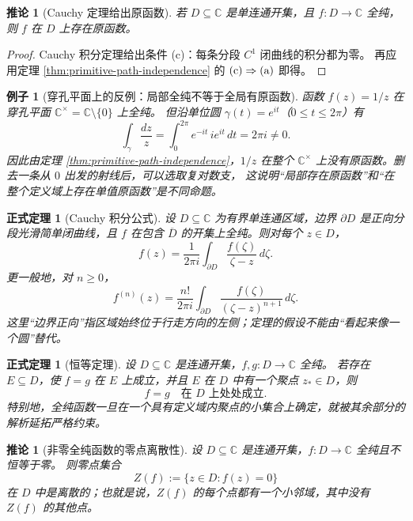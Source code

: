 \documentclass[UTF8,fontset=none,a4paper,11pt]{ctexart}
\theoremstyle{foundation-definition}
\theoremstyle{foundation-theorem}
\newtheorem{theorem}[definition]{正式定理}
\theoremstyle{foundation-proposition}
\theoremstyle{foundation-example}
\newtheorem{example}[definition]{例子}
\theoremstyle{foundation-remark}
\theoremstyle{foundation-theorem}
\newtheorem{corollary}[definition]{推论}
\newcommand{\C}{\mathbb C}
\begin{document}
\begin{corollary}[Cauchy 定理给出原函数]\label{cor:cauchy-primitive}
若 \(D\subseteq\mathbb C\) 是单连通开集，且 \(f:D\to\mathbb C\) 全纯，
则 \(f\) 在 \(D\) 上存在原函数。
\end{corollary}

\begin{proof}
Cauchy 积分定理给出条件 \textup{(c)}：每条分段 \(C^1\) 闭曲线的积分都为零。
再应用定理 \ref{thm:primitive-path-independence} 的
\(\textup{(c)}\Rightarrow\textup{(a)}\) 即得。
\end{proof}

\begin{example}[穿孔平面上的反例：局部全纯不等于全局有原函数]
函数 \(f(z)=1/z\) 在穿孔平面 \(\mathbb C^\times=\mathbb C\setminus\{0\}\) 上全纯。
但沿单位圆 \(\gamma(t)=e^{it}\)（\(0\leq t\leq2\pi\)）有
\[
\int_\gamma\frac{dz}{z}
=\int_0^{2\pi}e^{-it}\,i e^{it}\,dt
=2\pi i\neq0.
\]
因此由定理 \ref{thm:primitive-path-independence}，\(1/z\) 在整个
\(\mathbb C^\times\) 上没有原函数。删去一条从 \(0\) 出发的射线后，可以选取复对数支，
这说明“局部存在原函数”和“在整个定义域上存在单值原函数”是不同命题。
\end{example}

\begin{theorem}[Cauchy 积分公式]\label{thm:cauchy-integral-formula}
设 \(D\subseteq\C\) 为有界单连通区域，边界 \(\partial D\) 是正向分段光滑简单闭曲线，且 \(f\) 在包含 \(\overline D\) 的开集上全纯。则对每个 \(z\in D\)，
\[
f(z)=\frac{1}{2\pi i}
\int_{\partial D}\frac{f(\zeta)}{\zeta-z}\,d\zeta.
\]
更一般地，对 \(n\geq0\)，
\[
f^{(n)}(z)=\frac{n!}{2\pi i}
\int_{\partial D}
\frac{f(\zeta)}{(\zeta-z)^{n+1}}\,d\zeta.
\]
这里“边界正向”指区域始终位于行走方向的左侧；定理的假设不能由“看起来像一个圆”替代。
\end{theorem}

\begin{theorem}[恒等定理]
设 \(D\subseteq\mathbb C\) 是连通开集，\(f,g:D\to\mathbb C\) 全纯。
若存在 \(E\subseteq D\)，使 \(f=g\) 在 \(E\) 上成立，并且 \(E\)
在 \(D\) 中有一个聚点 \(z_\ast\in D\)，则
\[
f=g\quad\text{在 }D\text{ 上处处成立}.
\]
特别地，全纯函数一旦在一个具有定义域内聚点的小集合上确定，就被其余部分的解析延拓严格约束。
\end{theorem}

\begin{corollary}[非零全纯函数的零点离散性]\label{cor:holomorphic-zero-discrete}
设 \(D\subseteq\mathbb C\) 是连通开集，\(f:D\to\mathbb C\) 全纯且不恒等于零。
则零点集合
\[
Z(f):=\{z\in D:f(z)=0\}
\]
在 \(D\) 中是离散的；也就是说，\(Z(f)\) 的每个点都有一个小邻域，其中没有
\(Z(f)\) 的其他点。
\end{corollary}
\end{document}
